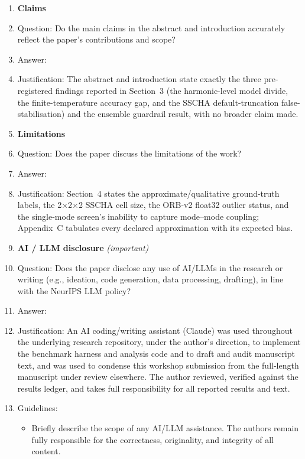 \begin{enumerate}

\item {\bf Claims}
    \item[] Question: Do the main claims in the abstract and introduction accurately reflect the paper's contributions and scope?
    \item[] Answer: \answerYes{}
    \item[] Justification: The abstract and introduction state exactly the three pre-registered findings reported in Section~3 (the harmonic-level model divide, the finite-temperature accuracy gap, and the SSCHA default-truncation false-stabilisation) and the ensemble guardrail result, with no broader claim made.

\item {\bf Limitations}
    \item[] Question: Does the paper discuss the limitations of the work?
    \item[] Answer: \answerYes{}
    \item[] Justification: Section~4 states the approximate/qualitative ground-truth labels, the 2$\times$2$\times$2 SSCHA cell size, the ORB-v2 float32 outlier status, and the single-mode screen's inability to capture mode--mode coupling; Appendix~C tabulates every declared approximation with its expected bias.

\item {\bf AI / LLM disclosure} \emph{(important)}
    \item[] Question: Does the paper disclose any use of AI/LLMs in the research or writing (e.g., ideation, code generation, data processing, drafting), in line with the NeurIPS LLM policy?
    \item[] Answer: \answerYes{}
    \item[] Justification: An AI coding/writing assistant (Claude) was used throughout the underlying research repository, under the author's direction, to implement the benchmark harness and analysis code and to draft and audit manuscript text, and was used to condense this workshop submission from the full-length manuscript under review elsewhere. The author reviewed, verified against the results ledger, and takes full responsibility for all reported results and text.
    \item[] Guidelines:
    \begin{itemize}
        \item Briefly describe the scope of any AI/LLM assistance. The authors remain fully responsible for the correctness, originality, and integrity of all content.
    \end{itemize}


\end{enumerate}
